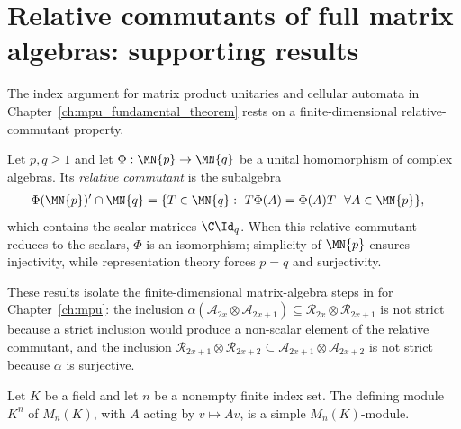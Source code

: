 
\chapter{Relative commutants of full matrix algebras: supporting results}%
\label{ch:matrix_relative_commutant}

The index argument for matrix product unitaries and cellular automata in
Chapter~\ref{ch:mpu_fundamental_theorem} rests on a finite-dimensional relative-commutant
property.

Let $p,q\geq1$ and let $\Phi:\MN{p}\to\MN{q}$ be a unital homomorphism of complex
algebras.  Its \emph{relative commutant} is the subalgebra
\begin{align}
    \Phi(\MN{p})^{\prime}\cap\MN{q}
     & =\{T\in\MN{q}:\
    T\Phi(A)=\Phi(A)T\ \ \forall A\in\MN{p}\},
    \label{eq:matalg_relative_commutant}
\end{align}
which contains the scalar matrices $\C\Id_q$.
When this relative commutant reduces to the scalars, $\Phi$ is an isomorphism;
simplicity of $\MN{p}$ ensures injectivity, while representation theory forces $p=q$
and surjectivity.

These results isolate the finite-dimensional matrix-algebra steps in \cite{Gross2012IndexTheory}
for Chapter~\ref{ch:mpu}: the inclusion
$\alpha(\mathcal A_{2x}\otimes\mathcal A_{2x+1})\subseteq
    \mathcal R_{2x}\otimes\mathcal R_{2x+1}$
\cite[lines~1276--1287]{Gross2012IndexTheory} is not strict because a
strict inclusion would produce a non-scalar element of the relative commutant, and the
inclusion
$\mathcal R_{2x+1}\otimes\mathcal R_{2x+2}\subseteq
    \mathcal A_{2x+1}\otimes\mathcal A_{2x+2}$
\cite[lines~1306--1315]{Gross2012IndexTheory} is not strict because
$\alpha$ is surjective.

\begin{lemma}
    \label{lem:matalg_defining_module_simple}
    \leanok
    Let $K$ be a field and let $n$ be a nonempty finite index set.  The
    defining module $K^n$ of $M_n(K)$, with $A$ acting by $v\mapsto Av$, is
    a simple $M_n(K)$-module.
\end{lemma}


